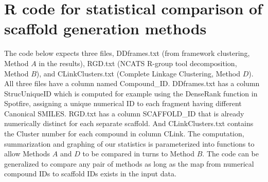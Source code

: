 \documentclass[11pt,letterpaper,biochem]{article}
\begin{document}
\newpage 

\section{R code for statistical comparison of scaffold generation methods}
\label{sec:statcode-scafcomp}

The code below expects three files, DDframes.txt (from framework clustering, Method $A$ in the results), RGD.txt (NCATS R-group tool decomposition, Method $B$), and CLinkClusters.txt (Complete Linkage Clustering, Method $D$). All three files have a column named Compound\_ID. DDframes.txt has a column StrucUniqueID which is computed for example using the DenseRank function in Spotfire, assigning a unique numerical ID to each fragment having different Canonical SMILES.  RGD.txt has a column SCAFFOLD\_ID that is already numerically distinct for each separate scaffold. And CLinkClusters.txt contains the Cluster number for each compound in column CLink. The computation, summarization and graphing of our statistics is parameterized into functions to allow Methods $A$ and $D$ to be compared in turns to Method $B$. The code can be generalized to compare any pair of methods as long as the map from numerical compound IDs to scaffold IDs exists in the input data. 
\end{document}
